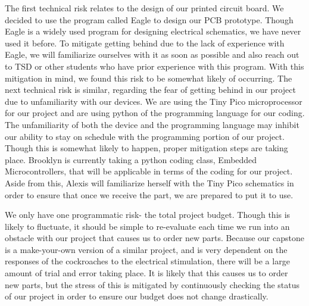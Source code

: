 \documentclass{article}
\begin{document}
\bigskip

\par The first technical risk relates to the design of our printed circuit board. We decided to use the program called Eagle to design our PCB prototype. Though Eagle is a widely used program for designing electrical schematics, we have never used it before. To mitigate getting behind due to the lack of experience with Eagle, we will familiarize ourselves with it as soon as possible and also reach out to TSD or other students who have prior experience with this program. With this mitigation in mind, we found this risk to be somewhat likely of occurring. The next technical risk is similar, regarding the fear of getting behind in our project due to unfamiliarity with our devices. We are using the Tiny Pico microprocessor for our project and are using python of the programming language for our coding. The unfamiliarity of both the device and the programming language may inhibit our ability to stay on schedule with the programming portion of our project. Though this is somewhat likely to happen, proper mitigation steps are taking place. Brooklyn is currently taking a python coding class, Embedded Microcontrollers, that will be applicable in terms of the coding for our project. Aside from this, Alexis will familiarize herself with the Tiny Pico schematics in order to ensure that once we receive the part, we are prepared to put it to use. 

\bigskip

\par We only have one programmatic risk- the total project budget. Though this is likely to fluctuate, it should be simple to re-evaluate each time we run into an obstacle with our project that causes us to order new parts. Because our capstone is a make-your-own version of a similar project, and is very dependent on the responses of the cockroaches to the electrical stimulation, there will be a large amount of trial and error taking place. It is likely that this causes us to order new parts, but the stress of this is mitigated by continuously checking the status of our project in order to ensure our budget does not change drastically. 

\bigskip
\end{document}
